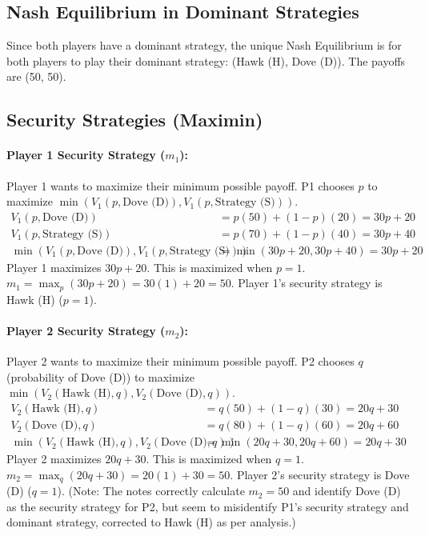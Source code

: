 \documentclass{article}
\begin{document}
\subsection{Nash Equilibrium in Dominant Strategies}
Since both players have a dominant strategy, the unique Nash Equilibrium is for both players to play their dominant strategy: (Hawk (H), Dove (D)). The payoffs are (50, 50).

\subsection{Security Strategies (Maximin)}

\paragraph{Player 1 Security Strategy ($m_1$):}
Player 1 wants to maximize their minimum possible payoff. P1 chooses $p$ to maximize $\min(V_1(p, \text{Dove (D)}), V_1(p, \text{Strategy (S)}))$.
\begin{align*} V_1(p, \text{Dove (D)}) &= p(50) + (1-p)(20) = 30p + 20 \\ V_1(p, \text{Strategy (S)}) &= p(70) + (1-p)(40) = 30p + 40 \\ \min(V_1(p, \text{Dove (D)}), V_1(p, \text{Strategy (S)})) &= \min(30p + 20, 30p + 40) = 30p + 20 \end{align*}
Player 1 maximizes $30p+20$. This is maximized when $p=1$.
$m_1 = \max_p (30p+20) = 30(1) + 20 = 50$.
Player 1's security strategy is Hawk (H) ($p=1$).

\paragraph{Player 2 Security Strategy ($m_2$):}
Player 2 wants to maximize their minimum possible payoff. P2 chooses $q$ (probability of Dove (D)) to maximize $\min(V_2(\text{Hawk (H)}, q), V_2(\text{Dove (D)}, q))$.
\begin{align*} V_2(\text{Hawk (H)}, q) &= q(50) + (1-q)(30) = 20q + 30 \\ V_2(\text{Dove (D)}, q) &= q(80) + (1-q)(60) = 20q + 60 \\ \min(V_2(\text{Hawk (H)}, q), V_2(\text{Dove (D)}, q)) &= \min(20q + 30, 20q + 60) = 20q + 30 \end{align*}
Player 2 maximizes $20q+30$. This is maximized when $q=1$.
$m_2 = \max_q (20q+30) = 20(1) + 30 = 50$.
Player 2's security strategy is Dove (D) ($q=1$).
(Note: The notes correctly calculate $m_2=50$ and identify Dove (D) as the security strategy for P2, but seem to misidentify P1's security strategy and dominant strategy, corrected to Hawk (H) as per analysis.)
\end{document}
